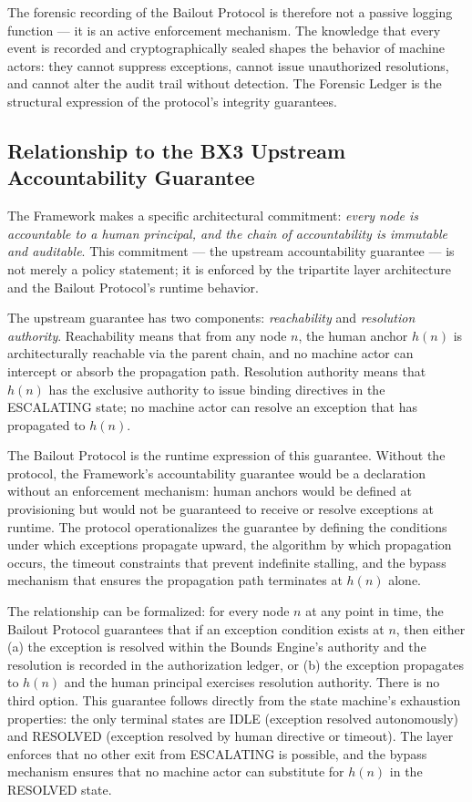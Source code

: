 The forensic recording of the Bailout Protocol is therefore not a passive logging function — it is an active enforcement mechanism. The knowledge that every event is recorded and cryptographically sealed shapes the behavior of machine actors: they cannot suppress exceptions, cannot issue unauthorized resolutions, and cannot alter the audit trail without detection. The Forensic Ledger is the structural expression of the protocol's integrity guarantees.

\subsection{Relationship to the BX3 Upstream Accountability Guarantee}

The \bxthree{} Framework makes a specific architectural commitment: \emph{every node is accountable to a human principal, and the chain of accountability is immutable and auditable}. This commitment — the upstream accountability guarantee — is not merely a policy statement; it is enforced by the tripartite layer architecture and the Bailout Protocol's runtime behavior.

The upstream guarantee has two components: \emph{reachability} and \emph{resolution authority}. Reachability means that from any node $n$, the human anchor $h(n)$ is architecturally reachable via the parent chain, and no machine actor can intercept or absorb the propagation path. Resolution authority means that $h(n)$ has the exclusive authority to issue binding directives in the ESCALATING state; no machine actor can resolve an exception that has propagated to $h(n)$.

The Bailout Protocol is the runtime expression of this guarantee. Without the protocol, the \bxthree{} Framework's accountability guarantee would be a declaration without an enforcement mechanism: human anchors would be defined at provisioning but would not be guaranteed to receive or resolve exceptions at runtime. The protocol operationalizes the guarantee by defining the conditions under which exceptions propagate upward, the algorithm by which propagation occurs, the timeout constraints that prevent indefinite stalling, and the bypass mechanism that ensures the propagation path terminates at $h(n)$ alone.

The relationship can be formalized: for every node $n$ at any point in time, the Bailout Protocol guarantees that if an exception condition exists at $n$, then either (a) the exception is resolved within the Bounds Engine's authority and the resolution is recorded in the authorization ledger, or (b) the exception propagates to $h(n)$ and the human principal exercises resolution authority. There is no third option. This guarantee follows directly from the state machine's exhaustion properties: the only terminal states are IDLE (exception resolved autonomously) and RESOLVED (exception resolved by human directive or timeout). The \fact{} layer enforces that no other exit from ESCALATING is possible, and the bypass mechanism ensures that no machine actor can substitute for $h(n)$ in the RESOLVED state.

